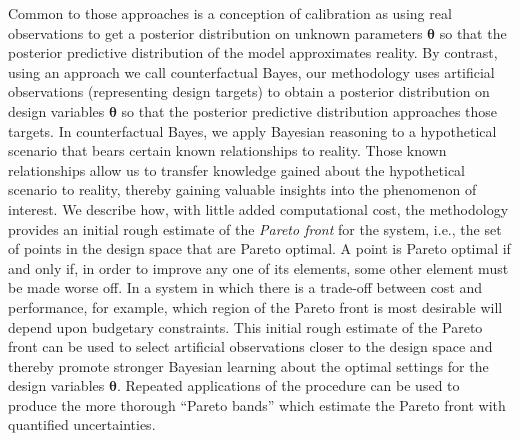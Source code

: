 \documentclass[12pt]{article}
\begin{document}
%
Common to those approaches is a conception of calibration as using real observations to get a posterior distribution on unknown parameters $\boldsymbol\theta$ so that the posterior predictive distribution of the model approximates reality.
%
By contrast, using an approach we call counterfactual Bayes, our methodology uses artificial observations (representing design targets) to obtain a posterior distribution on design variables $\boldsymbol\theta$ so that the posterior predictive distribution approaches those targets.
%
In counterfactual Bayes, we apply Bayesian reasoning to a hypothetical scenario that bears certain known relationships to reality.
%
Those known relationships allow us to transfer knowledge gained about the hypothetical scenario to reality, thereby gaining valuable insights into the phenomenon of interest.
%
We describe how, with little added computational cost, the methodology provides an initial rough estimate of the {\em Pareto front} for the system, i.e., the set of points in the design space that are Pareto optimal. 
%
A point is Pareto optimal if and only if, in order to improve any one of its elements, some other element must be made worse off.
%
%
In a system in which there is a trade-off between cost and performance, for example, which region of the Pareto front is most desirable will depend upon budgetary constraints.
%
This initial rough estimate of the Pareto front can be used to select artificial observations closer to the design space and thereby promote stronger Bayesian learning about the optimal settings for the design variables $\boldsymbol\theta$.
%
Repeated applications of the procedure can be used to produce the more thorough ``Pareto bands'' which estimate the Pareto front with quantified uncertainties.
%
\end{document}
